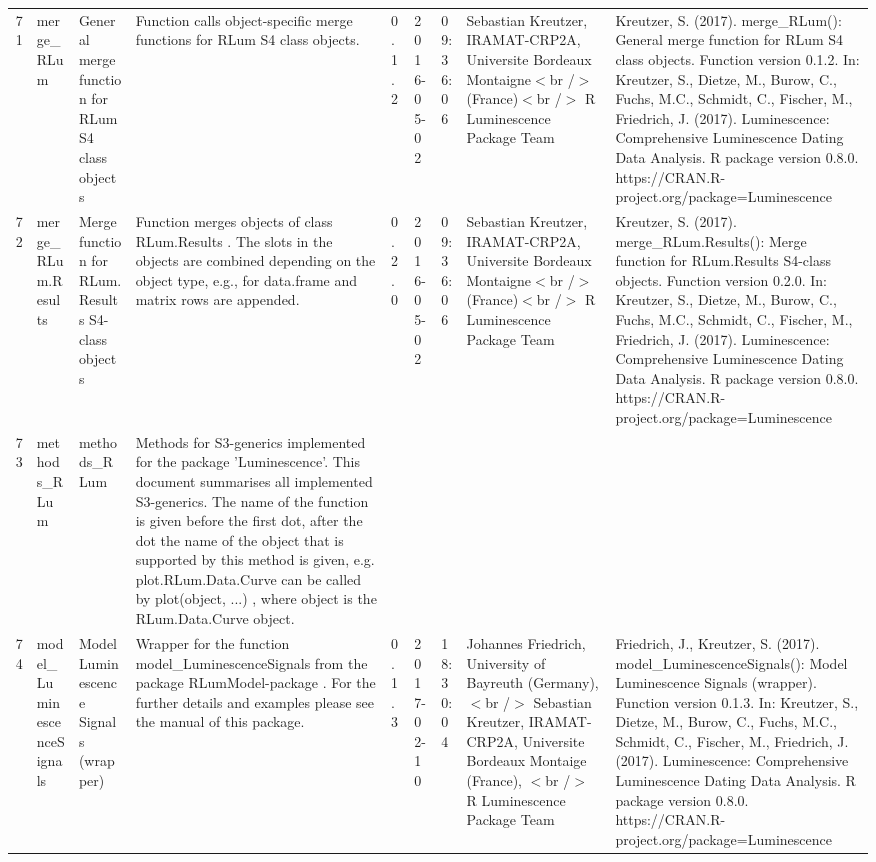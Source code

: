 \begin{table}[ht]
\begin{tabular}{rllllllll}
 \\ 
  71 & merge\_RLum & General merge function for RLum S4 class objects & Function calls object-specific merge functions for RLum S4 class objects. & 0.1.2 & 2016-05-02 & 09:36:06
 & Sebastian Kreutzer, IRAMAT-CRP2A, Universite Bordeaux Montaigne$<$br /$>$ (France)$<$br /$>$  R Luminescence Package Team & Kreutzer, S. (2017). merge\_RLum(): General merge function for RLum S4 class objects. Function version 0.1.2. In: Kreutzer, S., Dietze, M., Burow, C., Fuchs, M.C., Schmidt, C., Fischer, M., Friedrich, J. (2017). Luminescence: Comprehensive Luminescence Dating Data Analysis. R package version 0.8.0. https://CRAN.R-project.org/package=Luminescence
 \\ 
  72 & merge\_RLum.Results & Merge function for RLum.Results S4-class objects & Function merges objects of class  RLum.Results . The slots in the objects are combined depending on the object type, e.g., for  data.frame  and  matrix  rows are appended. & 0.2.0 & 2016-05-02 & 09:36:06
 & Sebastian Kreutzer, IRAMAT-CRP2A, Universite Bordeaux Montaigne$<$br /$>$ (France)$<$br /$>$  R Luminescence Package Team & Kreutzer, S. (2017). merge\_RLum.Results(): Merge function for RLum.Results S4-class objects. Function version 0.2.0. In: Kreutzer, S., Dietze, M., Burow, C., Fuchs, M.C., Schmidt, C., Fischer, M., Friedrich, J. (2017). Luminescence: Comprehensive Luminescence Dating Data Analysis. R package version 0.8.0. https://CRAN.R-project.org/package=Luminescence
 \\ 
  73 & methods\_RLum & methods\_RLum & Methods for S3-generics implemented for the package 'Luminescence'. This document summarises all implemented S3-generics. The name of the function is given before the first dot, after the dot the name of the object that is supported by this method is given, e.g.  plot.RLum.Data.Curve  can be called by  plot(object, ...) , where object  is the  RLum.Data.Curve  object. &  &  &  &  &  \\ 
  74 & model\_LuminescenceSignals & Model Luminescence Signals (wrapper) & Wrapper for the function  model\_LuminescenceSignals  from the package RLumModel-package . For the further details and examples please see the manual of this package. & 0.1.3 & 2017-02-10 & 18:30:04
 & Johannes Friedrich, University of Bayreuth (Germany), $<$br /$>$ Sebastian Kreutzer, IRAMAT-CRP2A, Universite Bordeaux Montaige (France),  $<$br /$>$  R Luminescence Package Team & Friedrich, J., Kreutzer, S. (2017). model\_LuminescenceSignals(): Model Luminescence Signals (wrapper). Function version 0.1.3. In: Kreutzer, S., Dietze, M., Burow, C., Fuchs, M.C., Schmidt, C., Fischer, M., Friedrich, J. (2017). Luminescence: Comprehensive Luminescence Dating Data Analysis. R package version 0.8.0. https://CRAN.R-project.org/package=Luminescence

\end{tabular}
\end{table}
